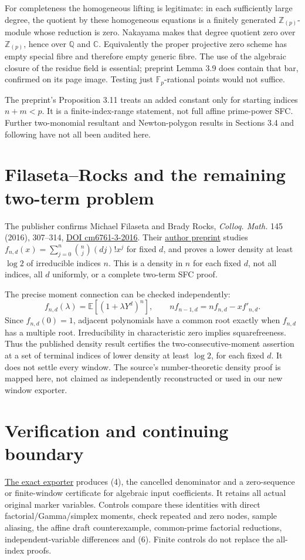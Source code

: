 \documentclass[11pt]{article}
\newcommand{\Q}{\mathbb Q}
\newcommand{\C}{\mathbb C}
\begin{document}
For completeness the homogeneous lifting is legitimate: in each sufficiently
large degree, the quotient by these homogeneous equations is a finitely
generated $\mathbb Z_{(p)}$-module whose reduction is zero. Nakayama makes
that degree quotient zero over $\mathbb Z_{(p)}$, hence over $\Q$ and $\C$.
Equivalently the proper projective zero scheme has empty special fibre and
therefore empty generic fibre. The use of the algebraic closure of the
residue field is essential; preprint Lemma 3.9 does contain that bar,
confirmed on its page image. Testing just $\mathbb F_p$-rational points
would not suffice.

The preprint's Proposition 3.11 treats an added constant only for starting
indices $n+m<p$. It is a finite-index-range statement, not full affine
prime-power SFC. Further two-monomial resultant and Newton-polygon results
in Sections 3.4 and following have not all been audited here.

\section{Filaseta--Rocks and the remaining two-term problem}
The publisher confirms Michael Filaseta and Brady Rocks,
\emph{Colloq. Math.} 145 (2016), 307--314,
\href{https://doi.org/10.4064/cm6761-3-2016}{DOI cm6761-3-2016}.
Their \href{sources/filaseta-rocks-author-preprint.pdf}{author preprint}
studies $f_{n,d}(x)=\sum_{j=0}^n\binom nj(dj)!x^j$ for fixed $d$,
and proves a lower density at least $\log2$ of irreducible indices $n$.
This is a density in $n$ for each fixed $d$, not all indices, all $d$
uniformly, or a complete two-term SFC proof.

The precise moment connection can be checked independently:
\[
 f_{n,d}(\lambda)=\mathbb E[(1+\lambda Y^d)^n],\qquad
 n f_{n-1,d}=n f_{n,d}-x f'_{n,d}.                 \tag{6}
\]
Since $f_{n,d}(0)=1$, adjacent polynomials have a common root exactly when
$f_{n,d}$ has a multiple root. Irreducibility in characteristic zero implies
squarefreeness. Thus the published density result certifies the
two-consecutive-moment assertion at a set of terminal indices of lower
density at least $\log2$, for each fixed $d$. It does not settle every
window. The source's number-theoretic density proof is mapped here, not
claimed as independently reconstructed or used in our new window exporter.

\section{Verification and continuing boundary}
\href{moment_windows.py}{The exact exporter} produces (4), the cancelled
denominator and a zero-sequence or finite-window certificate for algebraic
input coefficients. It retains all actual original marker variables.
Controls compare these identities with direct factorial/Gamma/simplex
moments, check repeated and zero nodes, sample aliasing, the affine draft
counterexample, common-prime factorial reductions, independent-variable
differences and (6). Finite controls do not replace the all-index proofs.
\end{document}
